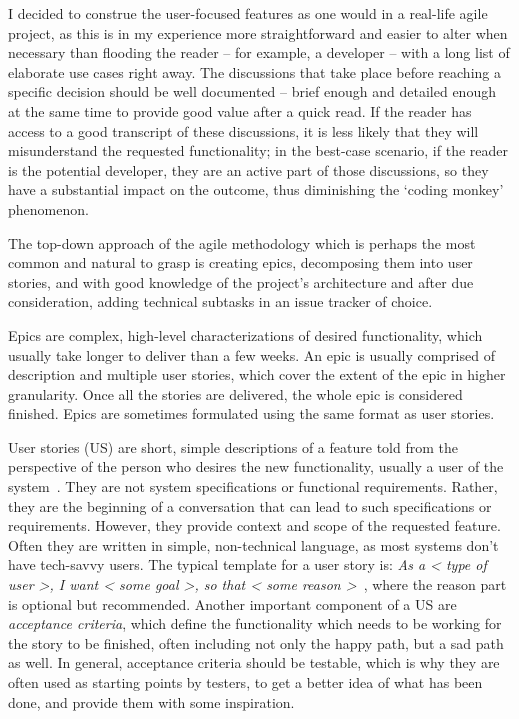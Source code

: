 I decided to construe the user-focused features as one would in a real-life agile project,
as this is in my experience more straightforward and easier to alter when necessary than flooding the reader -- for example, a developer -- with a long list of elaborate use cases right away.
The discussions that take place before reaching a specific decision should be well documented -- brief enough and detailed enough at the same time to provide good value after a quick read.
If the reader has access to a good transcript of these discussions, it is less likely that they will misunderstand the requested functionality;
in the best-case scenario, if the reader is the potential developer, they are an active part of those discussions, so they have a substantial impact on the outcome, thus diminishing the `coding monkey' phenomenon.

The top-down approach of the agile methodology which is perhaps the most common and natural to grasp is creating epics, decomposing them into user stories,
and with good knowledge of the project's architecture and after due consideration, adding technical subtasks in an issue tracker of choice.

Epics are complex, high-level characterizations of desired functionality, which usually take longer to deliver than a few weeks.
An epic is usually comprised of description and multiple user stories, which cover the extent of the epic in higher granularity.
Once all the stories are delivered, the whole epic is considered finished.
Epics are sometimes formulated using the same format as user stories.

User stories (US) are short, simple descriptions of a feature told from the perspective of the person who desires the new functionality, usually a user of the system~\cite{user-story-definition}.
They are not system specifications or functional requirements.
Rather, they are the beginning of a conversation that can lead to such specifications or requirements.
However, they provide context and scope of the requested feature.
Often they are written in simple, non-technical language, as most systems don't have tech-savvy users.
The typical template for a user story is:
\textit{As a < type of user >, I want < some goal >, so that < some reason >}~\cite{user-story-definition}, where the reason part is optional but recommended.
Another important component of a US are \textit{acceptance criteria}, which define the functionality which needs to be working for the story to be finished, often including not only the happy path, but a sad path as well.
In general, acceptance criteria should be testable, which is why they are often used as starting points by testers, to get a better idea of what has been done, and provide them with some inspiration.

